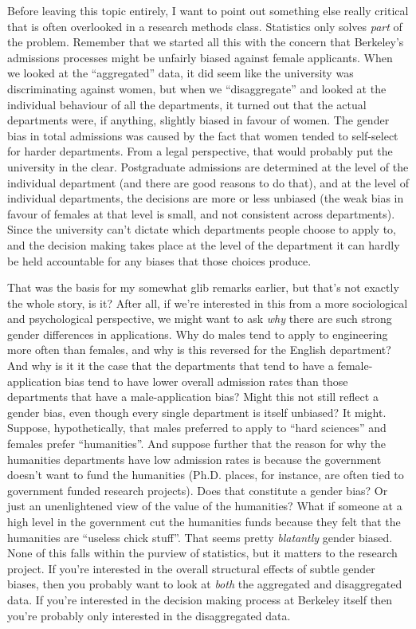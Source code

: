 Before leaving this topic entirely, I want to point out something else really critical that is often overlooked in a research methods class. Statistics only solves {\it part} of the problem. Remember that we started all this with the concern that Berkeley's admissions processes might be unfairly biased against female applicants. When we looked at the ``aggregated'' data, it did seem like the university was discriminating against women, but when we ``disaggregate'' and looked at the individual behaviour of all the departments, it turned out that the actual departments were, if anything, slightly biased in favour of women. The gender bias in total admissions was caused by the fact that women tended to self-select for harder departments.  From a legal perspective, that would probably put the university in the clear. Postgraduate admissions are determined at the level of the individual department (and there are good reasons to do that), and at the level of individual departments, the decisions are more or less unbiased (the weak bias in favour of females at that level is small, and not consistent across departments). Since the university can't dictate which departments people choose to apply to, and the decision making takes place at the level of the department it can hardly be held accountable for any biases that those choices produce. 

That was the basis for my somewhat glib remarks earlier, but that's not exactly the whole story, is it? After all, if we're interested in this from a more sociological and psychological perspective, we might want to ask {\it why} there are such strong gender differences in applications. Why do males tend to apply to engineering more often than females, and why is this reversed for the English department? And why is it it the case that the departments that tend to have a female-application bias tend to have lower overall admission rates than those departments that have a male-application bias? Might this not still reflect a gender bias, even though every single department is itself unbiased? It might. Suppose, hypothetically, that males preferred to apply to ``hard sciences'' and females prefer ``humanities''. And suppose further that the reason for why the humanities departments have low admission rates is  because the government doesn't want to fund the humanities (Ph.D. places, for instance, are often tied to government funded research projects). Does that constitute a gender bias? Or just an unenlightened view of the value of the humanities? What if someone at a high level in the government cut the humanities funds because they felt that the humanities are ``useless chick stuff''. That seems pretty {\it blatantly} gender biased. None of this falls within the purview of statistics, but it matters to the research project. If you're interested in the overall structural effects of subtle gender biases, then you probably want to look at {\it both} the aggregated and disaggregated data. If you're interested in the decision making process at Berkeley itself then you're probably only interested in the disaggregated data. 

